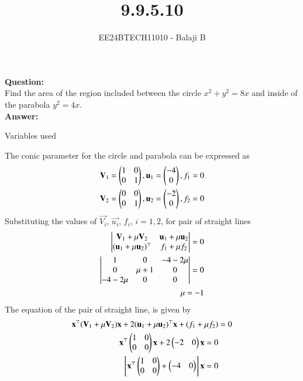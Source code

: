 \documentclass[journal]{IEEEtran}
\begin{document}

\vspace{3cm}

\title{9.9.5.10}
\author{EE24BTECH11010 - Balaji B}
{\let\newpage\relax\maketitle}
\textbf{Question:}\\
Find the area of the region included between the circle $x^2 + y^2 = 8x$ and inside of the parabola $y^2 = 4x$. \\
\textbf{Answer:}
\begin{table}[h!]
    \centering
    
    \caption{Variables used}
    \label{tab1-1.2-20}
\end{table} 

The conic parameter for the circle and parabola  can be expressed as 
\begin{align}
    \mathbf{V}_1 = \begin{pmatrix}1 & 0 \\ 0 & 1\end{pmatrix}, \mathbf{u}_1 = \begin{pmatrix}-4 \\ 0\end{pmatrix}, f_1 = 0 \\
    \mathbf{V}_2 = \begin{pmatrix}0 & 0 \\ 0 &1\end{pmatrix}, \mathbf{u}_2 = \begin{pmatrix}-2 \\ 0\end{pmatrix}, f_2 = 0
\end{align}
Substituting the values of $\vec{V_i}$, $\vec{u_i}$, $f_i$, $i = 1, 2$, for pair of straight lines\\
\begin{align}
 \begin{vmatrix}\mathbf{V}_1 + \mu\mathbf{V}_2 & \mathbf{u}_1 + \mu\mathbf{u}_2 \\ (\mathbf{u}_1+ \mu\mathbf{u}_2)^\top & f_1 + \mu f_2\end{vmatrix} = 0 \\
 \begin{vmatrix}1 & 0 & -4 -2\mu \\ 0 & \mu + 1 & 0 \\ -4-2\mu & 0 & 0\end{vmatrix} = 0   \\
 \mu = -1
\end{align}
The equation of the pair of straight line, is given by
\begin{align}
    \mathbf{x}^\top (\mathbf{V}_1+\mu\mathbf{V}_2)\mathbf{x}+2(\mathbf{u}_1 + \mu \mathbf{u}_2)^\top \mathbf{x} + (f_1 + \mu f_2) &= 0 \\
    \mathbf{x}^\top \begin{pmatrix}1 & 0 \\ 0 & 0\end{pmatrix}\mathbf{x}+2\begin{pmatrix}-2 & 0\end{pmatrix} \mathbf{x}   = 0  \\
    {}\left[\mathbf{x}^\top \begin{pmatrix}1 & 0 \\ 0 & 0\end{pmatrix} + \begin{pmatrix}-4 & 0\end{pmatrix}\right]\mathbf{x} = 0
\end{align}
\end{document}
